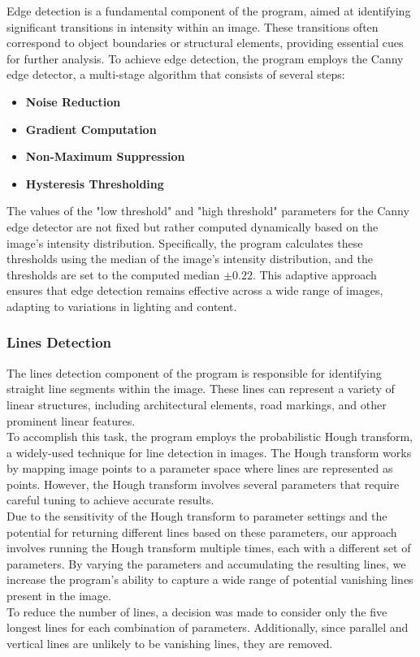 \begin{multicols}{2}
Edge detection is a fundamental component of the program, aimed at identifying significant transitions in intensity within an image.
These transitions often correspond to object boundaries or structural elements, providing essential cues for further analysis.
To achieve edge detection, the program employs the Canny edge detector, a multi-stage algorithm that consists of several steps:

\begin{itemize}
    \item \textbf{Noise Reduction}
    \item \textbf{Gradient Computation}
    \item \textbf{Non-Maximum Suppression}
    \item \textbf{Hysteresis Thresholding}
\end{itemize}
\noindent
The values of the "low threshold" and "high threshold" parameters for the Canny edge detector are not fixed
but rather computed dynamically based on the image's intensity distribution.
Specifically, the program calculates these thresholds using the median of the image's intensity distribution,
and the thresholds are set to the computed median $\pm 0.22$.
This adaptive approach ensures that edge detection remains effective across a wide range of images, adapting to variations in lighting and content.
\subsubsection{Lines Detection}
\label{subsubsec:lines-detection}

The lines detection component of the program is responsible for identifying straight line segments within the image.
These lines can represent a variety of linear structures, including architectural elements, road markings, and other prominent linear features.\\
To accomplish this task, the program employs the probabilistic Hough transform, a widely-used technique for line detection in images.
The Hough transform works by mapping image points to a parameter space where lines are represented as points.
However, the Hough transform involves several parameters that require careful tuning to achieve accurate results.\\
Due to the sensitivity of the Hough transform to parameter settings and the potential for returning different lines based on these parameters,
our approach involves running the Hough transform multiple times, each with a different set of parameters.
By varying the parameters and accumulating the resulting lines, we increase the program's ability to capture a wide range of potential vanishing lines
present in the image.\\
To reduce the number of lines, a decision was made to consider only the five longest lines for each combination of parameters.
Additionally, since parallel and vertical lines are unlikely to be vanishing lines, they are removed.


\end{multicols}
